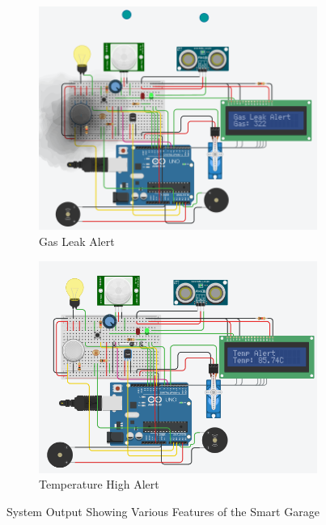 \documentclass{article}
\begin{document}
\begin{figure}[H]
    \begin{subfigure}{0.45\textwidth}
        \centering
        \includegraphics[width=\linewidth]{gas_alert.png}
        \caption{Gas Leak Alert}
    \end{subfigure}
    \hfill
    \begin{subfigure}{0.45\textwidth}
        \centering
        \includegraphics[width=\linewidth]{temp_alert.png}
        \caption{Temperature High Alert}
    \end{subfigure}
    \caption{System Output Showing Various Features of the Smart Garage}
    \label{fig:garage_output}
\end{figure}
\end{document}
